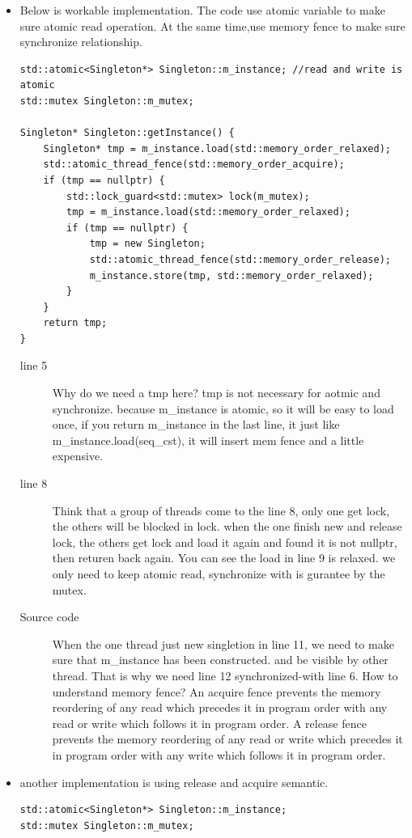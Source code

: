 \documentclass[a4paper,11pt,twoside]{book}
\begin{document}
\begin{itemize}
	
	\item Below is workable implementation. The code use atomic variable to make sure atomic read operation. At the same time,use memory fence to make sure synchronize relationship. 
	
\begin{lstlisting}[]
std::atomic<Singleton*> Singleton::m_instance; //read and write is atomic
std::mutex Singleton::m_mutex;

Singleton* Singleton::getInstance() {
	Singleton* tmp = m_instance.load(std::memory_order_relaxed);
	std::atomic_thread_fence(std::memory_order_acquire);
	if (tmp == nullptr) {
		std::lock_guard<std::mutex> lock(m_mutex);
		tmp = m_instance.load(std::memory_order_relaxed);
		if (tmp == nullptr) {
			tmp = new Singleton;
			std::atomic_thread_fence(std::memory_order_release);
			m_instance.store(tmp, std::memory_order_relaxed);
		}
	}
	return tmp;
}	
\end{lstlisting}	
	\begin{description}		
		\item[line 5] Why do we need a tmp here? tmp is not necessary for aotmic and synchronize. because m\_instance is atomic, so it will be easy to load once, if you return m\_instance in the last line, it just like m\_instance.load(seq\_cst), it will insert mem fence and a little expensive. 
		
		\item [line 8] Think that a group of threads come to the line 8,  only one get lock, the others will be blocked in lock. when the one finish new and release lock, the others get lock and load it again and found it is not nullptr, then returen back again.  You can see the load in line 9 is relaxed. we only need to keep atomic read, synchronize with is gurantee by the mutex. 
		
		\item [Source code] When the one thread just new singletion in line 11, we need to make sure that m\_instance has been constructed. and be visible by other thread. That is why we need line 12 synchronized-with line 6. How to understand memory fence? An acquire fence prevents the memory reordering of any read which precedes it in program order with any read or write which follows it in program order. A release fence prevents the memory reordering of any read or write which precedes it in program order with any write which follows it in program order.
	\end{description}
	
	\item another implementation is using release and acquire semantic.
\begin{lstlisting}[]
std::atomic<Singleton*> Singleton::m_instance;
std::mutex Singleton::m_mutex;


\end{lstlisting}
\end{itemize}
\end{document}
